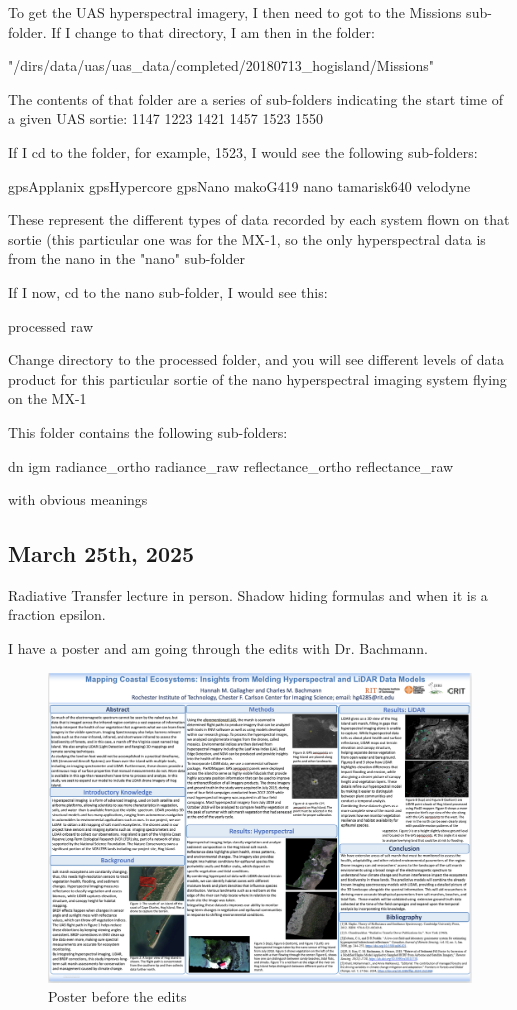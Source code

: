 \documentclass{article}
\begin{document}
To get the UAS hyperspectral imagery, I then need to got to the Missions sub-folder. If I change to that directory, I am then in the folder:

"/dirs/data/uas/uas_data/completed/20180713_hogisland/Missions"

The contents of that folder are a series of sub-folders indicating the start time of a given UAS sortie:
1147 1223 1421 1457 1523 1550

If I cd to the folder, for example, 1523, I would see the following sub-folders:

gpsApplanix gpsHypercore gpsNano makoG419 nano tamarisk640 velodyne

These represent the different types of data recorded by each system flown on that sortie (this particular one was for the MX-1, so the only hyperspectral data is from the nano in the "nano" sub-folder

If I now, cd to the nano sub-folder, I would see this:

processed raw

Change directory to the processed folder, and you will see different levels of data product for this particular sortie of the nano hyperspectral imaging system flying on the MX-1

This folder contains the following sub-folders:

dn igm radiance_ortho radiance_raw reflectance_ortho reflectance_raw


with obvious meanings

\subsection{March 25th, 2025}
Radiative Transfer lecture in person. Shadow hiding formulas and when it is a fraction epsilon. 

I have a poster and am going through the edits with Dr. Bachmann. 

\begin{figure}[h!]
\centering
\includegraphics[scale=.6]{March2025/Poster_Before_Edits.png}
\caption{Poster before the edits}
\label{fig:Poster before the edits}
\end{figure}
\end{document}
